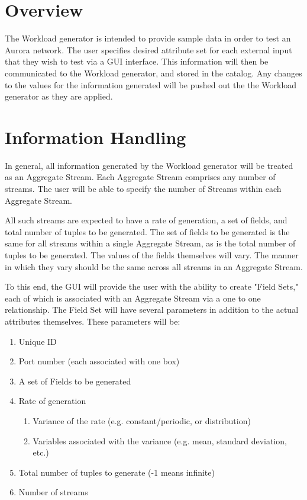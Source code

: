 \documentclass[a4paper,12pt]{article}
\begin{document}
\newcommand{\thisproj}{\bf GUI/Workload Communication}

\makeatletter                   %
\pagestyle{myheadings}              %
\def\@oddhead{\bf Aurora - \thisproj \hfill (arsinger, yx)} 
\makeatother     

\section*{Overview}

The Workload generator is intended to provide sample data in order to test an
Aurora network. The user specifies desired attribute set for each external input
that they wish to test via a GUI interface. This information will then be 
communicated to the Workload generator, and stored in the catalog. Any changes 
to the values for the information generated will be pushed out the the Workload
generator as they are applied.

\section*{Information Handling}

In general, all information generated by the Workload generator will be treated
as an Aggregate Stream. Each Aggregate Stream comprises any number of streams.
The user will be able to specify the number of Streams within each Aggregate
Stream. 

All such streams are expected to have a rate of generation, a set
of fields, and total number of tuples to be generated. The set of fields to
be generated is the same for all streams within a single Aggregate Stream, as is
the total number of tuples to be generated. The values of the fields
themselves will vary. The manner in which they vary should be the same
across all streams in an Aggregate Stream.

To this end, the GUI will provide the user with the ability to create "Field
Sets," each of which is associated with an Aggregate Stream via a one to one
relationship. The Field Set will have several parameters in addition to the
actual attributes themselves. These parameters will be:

\begin{enumerate}
\item Unique ID
\item Port number (each associated with one box)
\item A set of Fields to be generated
\item Rate of generation
\begin{enumerate}
\item Variance of the rate (e.g. constant/periodic, or distribution)
\item Variables associated with the variance (e.g. mean, standard deviation,
etc.)
\end{enumerate}
\item Total number of tuples to generate (-1 means infinite)
\item Number of streams
\end{enumerate}
\end{document}
